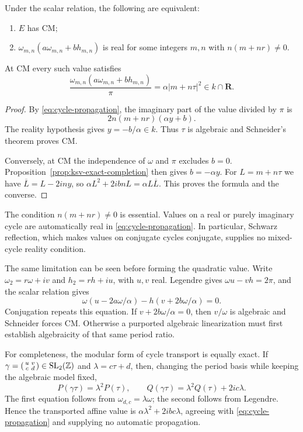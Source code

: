 \begin{proposition}\label{prop:real-propagation}
Under the scalar relation, the following are equivalent:
\begin{enumerate}
\item $E$ has CM;
\item $\omega_{m,n}(a\omega_{m,n}+bh_{m,n})$ is real for some
integers $m,n$ with $n(m+nr)\ne0$.
\end{enumerate}
At CM every such value satisfies
\[
 \frac{\omega_{m,n}(a\omega_{m,n}+bh_{m,n})}{\pi}
       =\alpha|m+n\tau|^2\in k\cap\mathbf R.
\]
\end{proposition}
\begin{proof}
By \eqref{eq:cycle-propagation}, the imaginary part of the value
divided by $\pi$ is
\[
 2n(m+nr)(\alpha y+b).
\]
The reality hypothesis gives $y=-b/\alpha\in k$.  Thus $\tau$ is
algebraic and Schneider's theorem proves CM.

Conversely, at CM the independence of $\omega$ and $\pi$ excludes
$b=0$.  Proposition~\ref{prop:ksv-exact-completion} then gives
$b=-\alpha y$.  For $L=m+n\tau$ we have
$\overline L=L-2iny$, so
$\alpha L^2+2ibnL=\alpha L\overline L$.  This proves the formula
and the converse.
\end{proof}

The condition $n(m+nr)\ne0$ is essential.  Values on a real or purely
imaginary cycle are automatically real in
\eqref{eq:cycle-propagation}.  In particular, Schwarz reflection,
which makes values on conjugate cycles conjugate, supplies no
mixed-cycle reality condition.

The same limitation can be seen before forming the quadratic value.
Write $\omega_2=r\omega+iv$ and $h_2=rh+iu$, with $u,v$ real.
Legendre gives $\omega u-vh=2\pi$, and the scalar relation gives
\[
 \omega(u-2a\omega/\alpha)
       -h(v+2b\omega/\alpha)=0.
\]
Conjugation repeats this equation.  If $v+2b\omega/\alpha=0$, then
$v/\omega$ is algebraic and Schneider forces CM.  Otherwise a
purported algebraic linearization must first establish algebraicity
of that same period ratio.

For completeness, the modular form of cycle transport is equally
exact.  If $\gamma=\left(\begin{smallmatrix}u&v\\c&d\end{smallmatrix}\right)
\in\operatorname{SL}_2(\mathbb Z)$ and $\lambda=c\tau+d$, then, changing
the period basis while keeping the algebraic model fixed,
\[
 P(\gamma\tau)=\lambda^2P(\tau),\qquad
 Q(\gamma\tau)=\lambda^2Q(\tau)+2ic\lambda.
\]
The first equation follows from $\omega_{d,c}=\lambda\omega$;
the second follows from Legendre.  Hence the transported affine
value is $\alpha\lambda^2+2ibc\lambda$, agreeing with
\eqref{eq:cycle-propagation} and supplying no automatic propagation.

